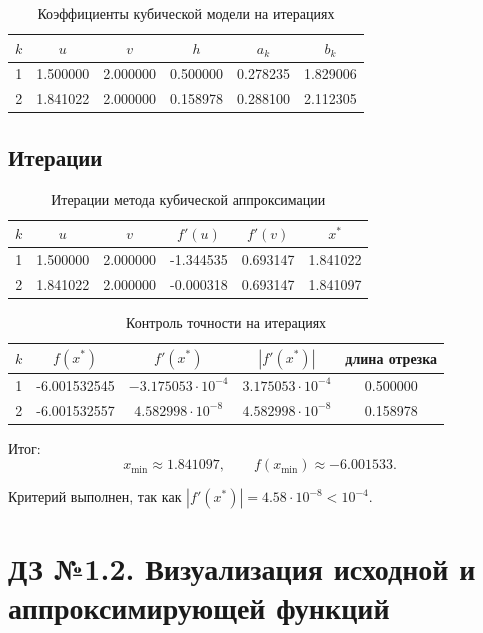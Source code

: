 \documentclass[12pt,a4paper]{article}
\begin{document}
\begin{table}[H]
\centering
\caption{Коэффициенты кубической модели на итерациях}
\begin{tabular}{cccccc}
\toprule
$k$ & $u$ & $v$ & $h$ & $a_k$ & $b_k$ \\
\midrule
1 & 1.500000 & 2.000000 & 0.500000 & 0.278235 & 1.829006 \\
2 & 1.841022 & 2.000000 & 0.158978 & 0.288100 & 2.112305 \\
\bottomrule
\end{tabular}
\end{table}

\subsection{Итерации}

\begin{table}[H]
\centering
\caption{Итерации метода кубической аппроксимации}
\begin{tabular}{cccccc}
\toprule
$k$ & $u$ & $v$ & $f'(u)$ & $f'(v)$ & $x^*$ \\
\midrule
1 & 1.500000 & 2.000000 & -1.344535 & 0.693147 & 1.841022 \\
2 & 1.841022 & 2.000000 & -0.000318 & 0.693147 & 1.841097 \\
\bottomrule
\end{tabular}
\end{table}

\begin{table}[H]
\centering
\caption{Контроль точности на итерациях}
\begin{tabular}{ccccc}
\toprule
$k$ & $f(x^*)$ & $f'(x^*)$ & $|f'(x^*)|$ & длина отрезка \\
\midrule
1 & -6.001532545 & $-3.175053\cdot 10^{-4}$ & $3.175053\cdot 10^{-4}$ & 0.500000 \\
2 & -6.001532557 & $4.582998\cdot 10^{-8}$ & $4.582998\cdot 10^{-8}$ & 0.158978 \\
\bottomrule
\end{tabular}
\end{table}

Итог:
\begin{equation}
  \boxed{x_{\min}\approx 1.841097}, \qquad
  \boxed{f(x_{\min})\approx -6.001533}.
\end{equation}

Критерий выполнен, так как $|f'(x^*)|=4.58\cdot 10^{-8}<10^{-4}$.

\section{ДЗ №1.2. Визуализация исходной и аппроксимирующей функций}
\end{document}
